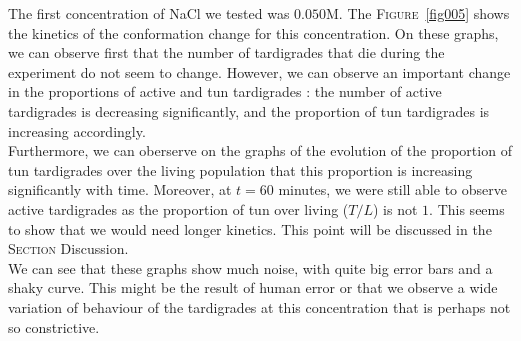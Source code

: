 \documentclass[12pt,a4paper, twocolumn]{article}
\begin{document}
The first concentration of NaCl we tested was $0.050$M. The \textsc{Figure}~\ref{fig005} shows the kinetics of the conformation change for this concentration. On these graphs, we can observe first that the number of tardigrades that die during the experiment do not seem to change. However, we can observe an important change in the proportions of active and tun tardigrades : the number of active tardigrades is decreasing significantly, and the proportion of tun tardigrades is increasing accordingly.\\
Furthermore, we can oberserve on the graphs of the evolution of the proportion of tun tardigrades over the living population that this proportion is increasing significantly with time. Moreover, at $t=60$ minutes, we were still able to observe active tardigrades as the proportion of tun over living ($T/L$) is not $1$. This seems to show that we would need longer kinetics. This point will be discussed in the \textsc{Section} Discussion.\\
We can see that these graphs show much noise, with quite big error bars and a shaky curve. This might be the result of human error or that we observe a wide variation of behaviour of the tardigrades at this concentration that is perhaps not so constrictive.
\end{document}
